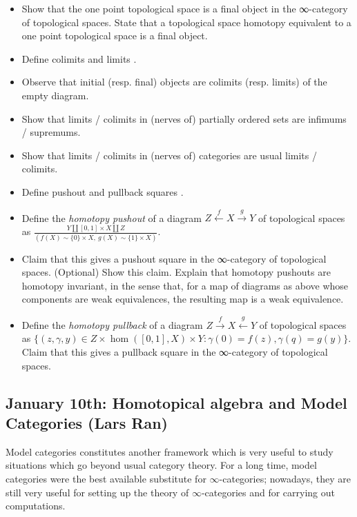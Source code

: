\documentclass{amsart}
\theoremstyle{definition}
\theoremstyle{remark}
\begin{document}
\begin{itemize}
\item Show that the one point topological space is a final object in the ∞-category of topological spaces. %
  State that a topological space homotopy equivalent to a one point topological space is a final object. %
\item Define colimits and limits \cite[Def.1.2.13.4]{HTT}. %
\item Observe that initial (resp. final) objects are colimits (resp. limits) of the empty diagram. %
\item Show that limits / colimits in (nerves of) partially ordered sets are infimums / supremums. %
\item Show that limits / colimits in (nerves of) categories are usual limits / colimits.
\item Define pushout and pullback squares \cite[Def.2.29]{HTT}. %
\item Define the \emph{homotopy pushout} of a diagram $Z \stackrel{f}{\leftarrow} X \stackrel{g}{\to} Y$  of topological spaces as $ \frac{Y \amalg [0,1]\times X \amalg Z}{(f(X) \sim \{0\} \times X, \ g(X) \sim \{1\} \times X)}$. %
\item Claim that this gives a pushout square in the ∞-category of topological spaces. (Optional) Show this claim. Explain that homotopy pushouts are homotopy invariant, in the sense that, for a map of diagrams as above whose components are weak equivalences, the resulting map is a weak equivalence.%
\item Define the \emph{homotopy pullback} of a diagram $Z \stackrel{f}{\rightarrow} X \stackrel{g}{\leftarrow} Y$  of topological spaces as $\{( z, \gamma, y) \in Z \times \hom([0,1], X) \times Y : \gamma(0) = f(z), \gamma(q) = g(y) \}$. Claim that this gives a pullback square in the ∞-category of topological spaces. %
\end{itemize}

\subsection{January 10th: Homotopical algebra and Model Categories (Lars Ran)}

Model categories constitutes another framework which is very useful to study situations which go beyond usual category theory. For a long time, model categories were the best available substitute for $\infty$-categories; nowadays, they are still very useful for setting up the theory of $\infty$-categories and for carrying out computations.
\end{document}
